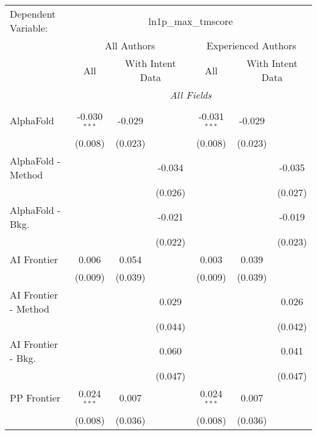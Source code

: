\begingroup
\centering
\begin{tabular}{lcccccc}
   \tabularnewline \midrule \midrule
   Dependent Variable: & \multicolumn{6}{c}{ln1p\_max\_tmscore}\\
 & \multicolumn{3}{c}{All Authors} & \multicolumn{3}{c}{Experienced Authors} \\
\cmidrule(lr){2-4} \cmidrule(lr){5-7}
 & \multicolumn{1}{c}{All} & \multicolumn{2}{c}{With Intent Data} & \multicolumn{1}{c}{All} & \multicolumn{2}{c}{With Intent Data} \\
\cmidrule(lr){2-2} \cmidrule(lr){3-4} \cmidrule(lr){5-5} \cmidrule(lr){6-7}
 & \multicolumn{6}{c}{\textit{All Fields}} \\ \\
   AlphaFold            & -0.030$^{***}$ & -0.029  &         & -0.031$^{***}$ & -0.029  &   \\   
                        & (0.008)        & (0.023) &         & (0.008)        & (0.023) &   \\   
   AlphaFold - Method   &                &         & -0.034  &                &         & -0.035\\   
                        &                &         & (0.026) &                &         & (0.027)\\   
   AlphaFold - Bkg.     &                &         & -0.021  &                &         & -0.019\\   
                        &                &         & (0.022) &                &         & (0.023)\\   
   AI Frontier          & 0.006          & 0.054   &         & 0.003          & 0.039   &   \\   
                        & (0.009)        & (0.039) &         & (0.009)        & (0.039) &   \\   
   AI Frontier - Method &                &         & 0.029   &                &         & 0.026\\   
                        &                &         & (0.044) &                &         & (0.042)\\   
   AI Frontier - Bkg.   &                &         & 0.060   &                &         & 0.041\\   
                        &                &         & (0.047) &                &         & (0.047)\\   
   PP Frontier          & 0.024$^{***}$  & 0.007   &         & 0.024$^{***}$  & 0.007   &   \\   
                        & (0.008)        & (0.036) &         & (0.008)        & (0.036) &   \\   

\end{tabular}
